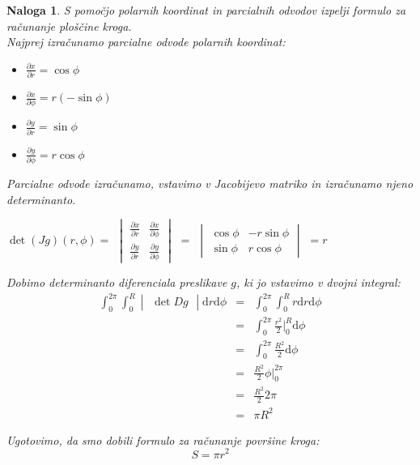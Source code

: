 \documentclass[12pt, a4paper]{article}
\newtheorem{naloga}{Naloga}
\begin{document}
\begin{naloga}
S pomočjo polarnih koordinat in parcialnih odvodov izpelji formulo za računanje ploščine kroga. \\
\emph
{Najprej izračunamo parcialne odvode polarnih koordinat:}

\begin{itemize}
\item $\frac{\partial x}{\partial r}= \cos \phi$
\item $\frac{\partial x}{\partial \phi}= r  (-\sin \phi)$
\item $\frac{\partial y}{\partial r}= \sin \phi$
\item $\frac{\partial y}{\partial \phi}= r  \cos \phi$ \\
\end{itemize}
\emph
{Parcialne odvode izračunamo, vstavimo v Jacobijevo matriko in izračunamo njeno determinanto.}
\\
\begin{center}
 {
$\det (Jg)(r,\phi)=$ \large $ \begin{vmatrix} \frac{\partial x}{\partial r}  &  \frac{\partial x}{\partial \phi}  \\  \frac{\partial y}{\partial r}  &  \frac{\partial y}{\partial \phi}  \end{vmatrix} $ $=$ \normalsize $\begin{vmatrix} \cos \phi & -r \sin \phi \\ \sin \phi & r \cos \phi \end{vmatrix} $  $= r$
}
\end{center}

\emph
{Dobimo determinanto diferenciala preslikave $g$, ki jo vstavimo v dvojni integral:}
\begin{eqnarray*}
\int^{2\pi}_{0} \int^{R}_{0}   \begin{vmatrix} \det Dg \end{vmatrix}  \mathrm{d} r \mathrm{d}\phi &=&  \int^{2\pi}_{0} \int^{R}_{0}  r \mathrm{d} r \mathrm{d}\phi \\
 &=&  \int^{2\pi}_{0} \frac{r^2}{2} \big|^{R}_{0} \mathrm{d}\phi \\
 &=&  \int^{2\pi}_{0} \frac{R^2}{2} \mathrm{d}\phi \\
 &=&  \frac{R^2}{2} \phi  \big|^{2\pi}_{0} \\
 &=&  \frac{R^2}{2} 2\pi \\
 &=&  \pi R^2
\end{eqnarray*}

\emph
{Ugotovimo, da smo dobili formulo za računanje površine kroga:}
$$
S=\pi r^2
$$
\end{naloga}
\end{document}
